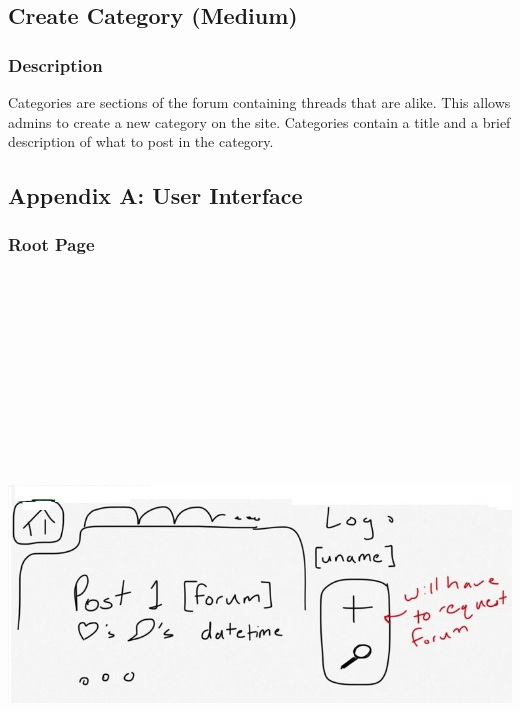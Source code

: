 \documentclass[12pt]{scrartcl}
\begin{document}
\subsection{Create Category (Medium)}
\subsubsection{Description}
Categories are sections of the forum containing threads that are alike.
This allows admins to create a new category on the site. Categories contain a title and a brief description of what to post in the category.






\subsection{Appendix A: User Interface}

\subsubsection{Root Page}

\includegraphics[width=17cm, height=17cm, keepaspectratio]{homepage.jpg}
\end{document}
